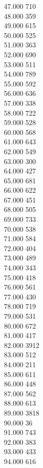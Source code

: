 { 47.000	710 \\
 48.000	359 \\
 49.000	615 \\
 50.000	525 \\
 51.000	363 \\
 52.000	690 \\
 53.000	511 \\
 54.000	789 \\
 55.000	592 \\
 56.000	636 \\
 57.000	338 \\
 58.000	722 \\
 59.000	528 \\
 60.000	568 \\
 61.000	643 \\
 62.000	549 \\
 63.000	300 \\
 64.000	427 \\
 65.000	681 \\
 66.000	622 \\
 67.000	451 \\
 68.000	505 \\
 69.000	733 \\
 70.000	538 \\
 71.000	584 \\
 72.000	404 \\
 73.000	489 \\
 74.000	343 \\
 75.000	418 \\
 76.000	561 \\
 77.000	430 \\
 78.000	719 \\
 79.000	531 \\
 80.000	672 \\
 81.000	417 \\
 82.000	3912 \\
 83.000	512 \\
 84.000	211 \\
 85.000	611 \\
 86.000	448 \\
 87.000	562 \\
 88.000	613 \\
 89.000	3818 \\
 90.000	36 \\
 91.000	743 \\
 92.000	383 \\
 93.000	433 \\
 94.000	616 \\
}
